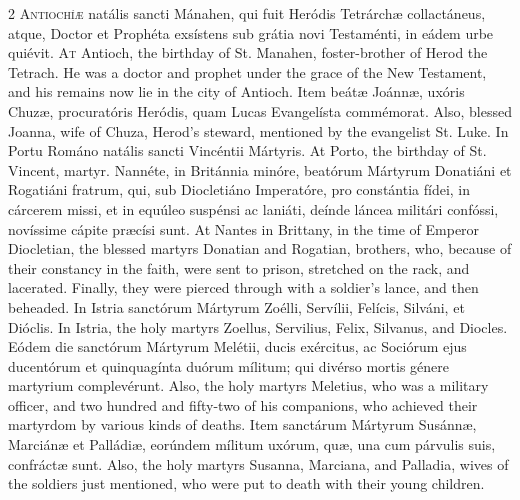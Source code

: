 \begin{paracol}{2}
\lettrine[lines=2]{A}{ntiochíæ} natális 
 sancti Mánahen, qui fuit Heródis Tetrárchæ collactáneus, atque, Doctor et 
 Prophéta exsístens sub grátia novi Testaménti, in eádem urbe quiévit.
\switchcolumn
{}
\lettrine[lines=2]{A}{t} Antioch, the birthday of St. 
 Manahen, foster-brother of Herod the Tetrach. He was a doctor and 
 prophet under the grace of the New Testament, and his remains now lie in the 
 city of Antioch.
\switchcolumn*
{}
Item beátæ Joánnæ, 
 uxóris Chuzæ, procuratóris Heródis, quam Lucas Evangelísta commémorat.
\switchcolumn
{}
Also, blessed Joanna, wife of Chuza, 
 Herod's steward, mentioned by the evangelist St. Luke.
\switchcolumn*
{}
In Portu Románo 
 natális sancti Vincéntii Mártyris.
\switchcolumn
{}
At Porto, the birthday of St. 
 Vincent, martyr.
\switchcolumn*
{}
Nannéte, in Británnia minóre, beatórum Mártyrum Donatiáni et Rogatiáni fratrum, qui, sub 
 Diocletiáno Imperatóre, pro constántia fídei, in cárcerem missi, et in 
 equúleo suspénsi ac laniáti, deínde láncea militári confóssi, novíssime 
 cápite præcísi sunt.
\switchcolumn
{}
At Nantes in Brittany, in the time 
 of Emperor Diocletian, the blessed martyrs Donatian and Rogatian, brothers, 
 who, because of their constancy in the faith, were sent to prison, stretched 
 on the rack, and lacerated. Finally, they were pierced through with a 
 soldier's lance, and then beheaded.
\switchcolumn*
{}
In Istria sanctórum 
 Mártyrum Zoélli, Servílii, Felícis, Silváni, et Dióclis.
\switchcolumn
{}
In Istria, the holy martyrs Zoellus, 
 Servilius, Felix, Silvanus, and Diocles.
\switchcolumn*
{}
Eódem die sanctórum 
 Mártyrum Melétii, ducis exércitus, ac Sociórum ejus ducentórum et 
 quinquagínta duórum mílitum; qui divérso mortis génere martyrium 
 complevérunt.
\switchcolumn
{}
Also, the holy martyrs Meletius, 
 who was a military officer, and two hundred and fifty-two of his companions, 
 who achieved their martyrdom by various kinds of deaths.
\switchcolumn*
{}
Item sanctárum 
 Mártyrum Susánnæ, Marciánæ et Palládiæ, eorúndem mílitum uxórum, quæ, una 
 cum párvulis suis, confráctæ sunt.
\switchcolumn
{}
Also, the holy martyrs Susanna, 
 Marciana, and Palladia, wives of the soldiers just mentioned, who were put 
 to death with their young children.

\end{paracol}
